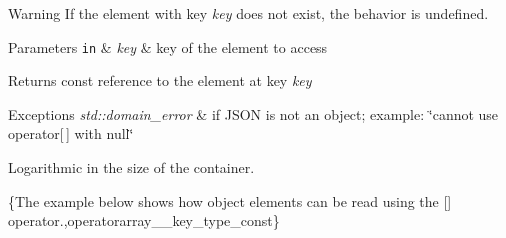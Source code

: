 \begin{DoxyWarning}{Warning}
If the element with key {\itshape key} does not exist, the behavior is undefined.
\end{DoxyWarning}

\begin{DoxyParams}[1]{Parameters}
\mbox{\tt in}  & {\em key} & key of the element to access\\
\hline
\end{DoxyParams}
\begin{DoxyReturn}{Returns}
const reference to the element at key {\itshape key} 
\end{DoxyReturn}

\begin{DoxyExceptions}{Exceptions}
{\em std\-::domain\-\_\-error} & if J\-S\-O\-N is not an object; example\-: {\ttfamily \char`\"{}cannot use
operator\mbox{[}$\,$\mbox{]} with null\char`\"{}}\\
\hline
\end{DoxyExceptions}
Logarithmic in the size of the container.

\{The example below shows how object elements can be read using the {\ttfamily \mbox{[}\mbox{]}} operator.,operatorarray\-\_\-\-\_\-key\-\_\-type\-\_\-const\}

